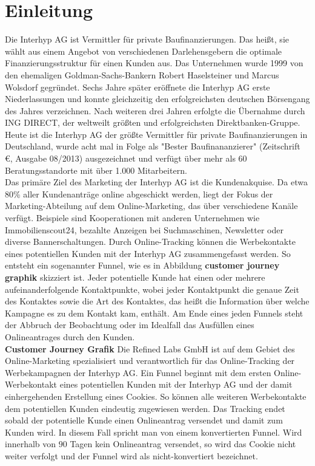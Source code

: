 \section{Einleitung}

Die Interhyp AG ist Vermittler für private Baufinanzierungen. Das heißt, sie wählt aus einem Angebot von verschiedenen Darlehensgebern die optimale Finanzierungsstruktur für einen Kunden aus. Das Unternehmen wurde 1999 von den ehemaligen Goldman-Sachs-Bankern Robert Haselsteiner und Marcus Wolsdorf gegründet. Sechs Jahre später eröffnete die Interhyp AG erste Niederlassungen und konnte gleichzeitig den erfolgreichsten deutschen Börsengang des Jahres verzeichnen. Nach weiteren drei Jahren erfolgte die Übernahme durch ING DIRECT, der weltweilt größten und erfolgreichsten Direktbanken-Gruppe. Heute ist die Interhyp AG der größte Vermittler für private Baufinanzierungen in Deutschland, wurde acht mal in Folge als "Bester Baufinananzierer" (Zeitschrift \euro, Ausgabe 08/2013) ausgezeichnet und verfügt über mehr als 60 Beratungsstandorte mit über 1.000 Mitarbeitern.\\
Das primäre Ziel des Marketing der Interhyp AG ist die Kundenakquise. Da etwa 80\% aller Kundenanträge online abgeschickt werden, liegt der Fokus der Marketing-Abteilung auf dem Online-Marketing, das über verschiedene Kanäle verfügt. Beispiele sind Kooperationen mit anderen Unternehmen wie Immobilienscout24, bezahlte Anzeigen bei Suchmaschinen, Newsletter oder diverse Bannerschaltungen. Durch Online-Tracking können die Werbekontakte eines potentiellen Kunden mit der Interhyp AG zusammengefasst werden. So entsteht ein sogenannter Funnel, wie es in Abbildung \textbf{customer journey graphik} skizziert ist. Jeder potentielle Kunde hat einen oder mehrere aufeinanderfolgende Kontaktpunkte, wobei jeder Kontaktpunkt die genaue Zeit des Kontaktes sowie die Art des Kontaktes, das heißt die Information über welche Kampagne es zu dem Kontakt kam, enthält. Am Ende eines jeden Funnels steht der Abbruch der Beobachtung oder im Idealfall das Ausfüllen eines Onlineantrages durch den Kunden.\\
\textbf{Customer Journey Grafik}
Die Refined Labs GmbH ist auf dem Gebiet des Online-Marketing spezialisiert und verantwortlich für das Online-Tracking der Werbekampagnen der Interhyp AG. Ein Funnel beginnt mit dem ersten Online-Werbekontakt eines potentiellen Kunden mit der Interhyp AG und der damit einhergehenden Erstellung eines Cookies. So können alle weiteren Werbekontakte dem potentiellen Kunden eindeutig zugewiesen werden. Das Tracking endet sobald der potentielle Kunde einen Onlineantrag versendet und damit zum Kunden wird. In diesem Fall spricht man von einem konvertierten Funnel. Wird innerhalb von $90$ Tagen kein Onlineantrag versendet, so wird das Cookie nicht weiter verfolgt und der Funnel wird als nicht-konvertiert bezeichnet.\\
